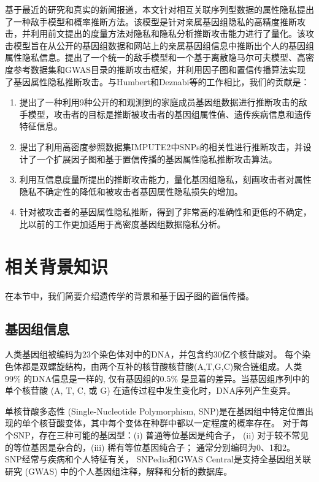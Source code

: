 基于最近的研究和真实的新闻报道，本文针对相互关联序列型数据的属性隐私提出了一种敌手模型和概率推断方法。该模型是针对亲属基因组隐私的高精度推断攻击，并利用前文提出的度量方法对隐私和隐私分析推断攻击能力进行了量化。该攻击模型旨在从公开的基因组数据和网站上的亲属基因组信息中推断出个人的基因组属性隐私信息。提出了一个统一的敌手模型和一个基于离散隐马尔可夫模型、高密度参考数据集和GWAS目录的推断攻击框架，并利用因子图和置信传播算法实现了基因属性隐私推断攻击。与Humbert和Deznabi等\cite{deznabi2018inference}的工作相比，我们的贡献是：

\begin{enumerate}
	\item 提出了一种利用9种公开的和观测到的家庭成员基因组数据进行推断攻击的敌手模型，攻击者的目标是推断被攻击者的基因组属性值、遗传疾病信息和遗传特征信息。
	\item 提出了利用高密度参照数据集IMPUTE2\cite{howie2014impute2}中SNPs的相关性进行推断攻击，并设计了一个扩展因子图和基于置信传播的基因属性隐私推断攻击算法。
	\item 利用互信息度量所提出的推断攻击能力，量化基因组隐私，刻画攻击者对属性隐私不确定性的降低和被攻击者基因属性隐私损失的增加。
	\item 针对被攻击者的基因属性隐私推断，得到了非常高的准确性和更低的不确定，比以前的工作更加适用于高密度基因组数据隐私分析。
\end{enumerate}

\section{相关背景知识}
\label{sec:backgrounds}
在本节中，我们简要介绍遗传学的背景和基于因子图的置信传播。

\subsection{基因组信息}

人类基因组被编码为23个染色体对中的DNA，并包含约30亿个核苷酸对。 每个染色体都是双螺旋结构，由两个互补的核苷酸核苷酸(A,T,G,C)聚合链组成。人类 99\% 的DNA信息是一样的, 仅有基因组的0.5\% 是显着的差异。当基因组序列中的单个核苷酸 (A, T, C, 或 G) 在遗传过程中发生变化时，DNA序列产生变异。

单核苷酸多态性 (Single-Nucleotide Polymorphism, SNP)是在基因组中特定位置出现的单个核苷酸变体，其中每个变体在种群中都以一定程度的概率存在。 对于每个SNP，存在三种可能的基因型：(i) 普通等位基因是纯合子， (ii) 对于较不常见的等位基因是杂合的，(iii) 稀有等位基因纯合子； 通常分别编码为0、1和2。 SNP经常与疾病和个人特征有关， SNPedia和GWAS Central是支持全基因组关联研究 (GWAS) 中的个人基因组注释，解释和分析的数据库。

